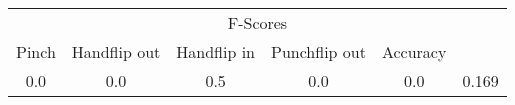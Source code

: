 \documentclass{standalone}
\begin{document}
 
 \begin{tabular}{|c|c|c|c|c ||c|}
\cline{1-6}\multicolumn{6}{|c|}{F-Scores} \\ 
\cline{1-6}Pinch & Handflip out & Handflip in & Punchflip out & Accuracy\\ 
\cline{1-6}0.0 & 0.0 & 0.5 & 0.0 & 0.0 & 0.169\\ 
 \cline{1-6}\hline \end{tabular}
 
\end{document}
